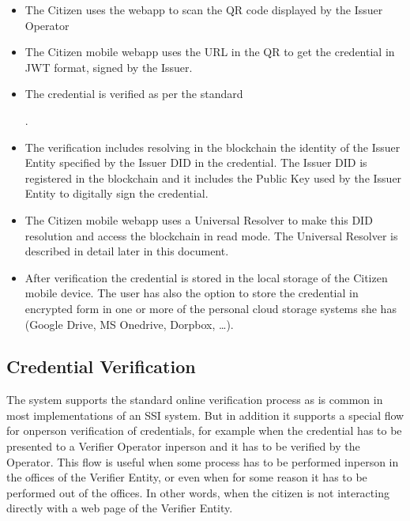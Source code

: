 \documentclass[a4paper,12pt,english,openany]{sphinxmanual}
\begin{document}
\sphinxAtStartPar
{}
\begin{itemize}
\item {} 
\sphinxAtStartPar
The Citizen uses the webapp to scan the QR code displayed by the Issuer Operator

\item {} 
\sphinxAtStartPar
The Citizen mobile webapp uses the URL in the QR to get the credential in JWT format, signed by the Issuer.

\end{itemize}

\sphinxAtStartPar
{}
\begin{itemize}
\item {} 
\sphinxAtStartPar
The credential is verified as per the standard %
\begin{footnote}[4]\sphinxAtStartFootnote
{}
%
\end{footnote}.

\item {} 
\sphinxAtStartPar
The verification includes resolving in the blockchain the identity of the Issuer Entity specified by the Issuer DID in the credential. The Issuer DID is registered in the blockchain and it includes the Public Key used by the Issuer Entity to digitally sign the credential.

\item {} 
\sphinxAtStartPar
The Citizen mobile webapp uses a Universal Resolver to make this DID resolution and access the blockchain in read mode. The Universal Resolver is described in detail later in this document.

\item {} 
\sphinxAtStartPar
After verification the credential is stored in the local storage of the Citizen mobile device. The user has also the option to store the credential in encrypted form in one or more of the personal cloud storage systems she has (Google Drive, MS Onedrive, Dorpbox, …).

\end{itemize}


\subsection{Credential Verification}
\label{\detokenize{privacycred:credential-verification}}
\sphinxAtStartPar
The system supports the standard online verification process as is common in most implementations of an SSI system. But in addition it supports a special flow for on\sphinxhyphen{}person verification of credentials, for example when the credential has to be presented to a Verifier Operator in\sphinxhyphen{}person and it has to be verified by the Operator.
This flow is useful when some process has to be performed in\sphinxhyphen{}person in the offices of the Verifier Entity, or even when for some reason it has to be performed out of the offices. In other words, when the citizen is not interacting directly with a web page of the Verifier Entity.
\end{document}
